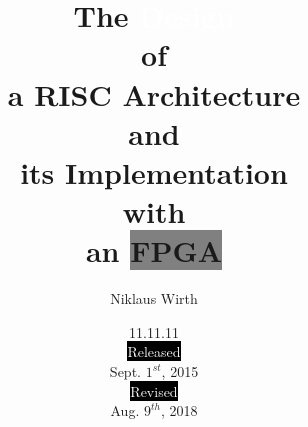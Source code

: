 \documentclass[a5paper]{scrarticle}
\begin{document}
\title{The \colorbox{cl4}{\textcolor{white}{Design}}\\of\\a
           \colorbox{cl1}{\textcolor{cl6}{RISC}} Architecture\\and\\its
           \colorbox{cl3}{\textcolor{cl5}{Implementation}}\\with\\an
           \colorbox{gray}{\textcolor{cl2}{FPGA}}}
\author{Niklaus Wirth}
\date{11.11.11\\\colorbox{black}{\textcolor{white}{Released}}\\Sept. $1^{st}$, 2015
              \\\colorbox{black}{\textcolor{white}{Revised}}\\Aug. $9^{th}$, 2018}
\maketitle





\appendix


\end{document}
